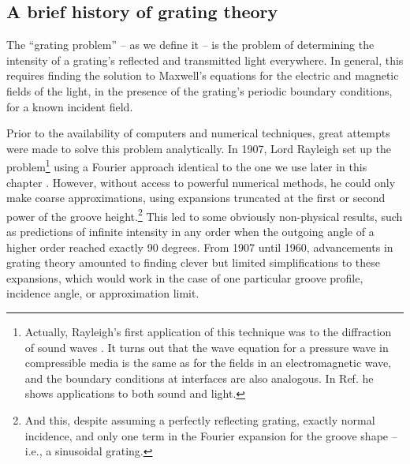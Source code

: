 \subsection{A brief history of grating theory}

The ``grating problem'' -- as we define it -- is the problem of determining the intensity of a grating's reflected and transmitted light everywhere.  In general, this requires finding the solution to Maxwell's equations for the electric and magnetic fields of the light, in the presence of the grating's periodic boundary conditions, for a known incident field.  

Prior to the availability of computers and numerical techniques, great attempts were made to solve this problem analytically.  In 1907, Lord Rayleigh set up the problem\footnote{Actually, Rayleigh's first application of this technique was to the diffraction of sound waves \cite{Ray86}.  It turns out that the wave equation for a pressure wave in compressible media is the same as for the fields in an electromagnetic wave, and the boundary conditions at interfaces are also analogous. In Ref. \cite{Ray07} he shows applications to both sound and light.} using a Fourier approach identical to the one we use later in this chapter \cite{Ray07}.  However, without access to powerful numerical methods, he could only make coarse approximations, using expansions truncated at the first or second power of the groove height.\footnote{And this, despite assuming a perfectly reflecting grating, exactly normal incidence, and only one term in the Fourier expansion for the groove shape -- i.e., a sinusoidal grating.}  This led to some obviously non-physical results, such as predictions of infinite intensity in any order when the outgoing angle of a higher order reached exactly 90 degrees.  From 1907 until 1960, advancements in grating theory amounted to finding clever but limited simplifications to these expansions, which would work in the case of one particular groove profile, incidence angle, or approximation limit.

